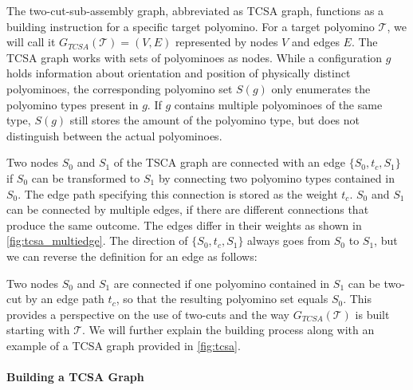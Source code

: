 The two-cut-sub-assembly graph, abbreviated as TCSA graph, functions as a building instruction for a specific target polyomino.
For a target polyomino $\mathcal{T}$, we will call it $G_{\textit{TCSA}}(\mathcal{T}) = (V,E)$ represented by nodes $V$ and edges $E$.
The TCSA graph works with sets of polyominoes as nodes.
While a configuration $g$ holds information about orientation and position of physically distinct polyominoes, the corresponding polyomino set $S(g)$ only enumerates the polyomino types present in $g$.
If $g$ contains multiple polyominoes of the same type, $S(g)$ still stores the amount of the polyomino type, but does not distinguish between the actual polyominoes.

Two nodes $S_0$ and $S_1$ of the TSCA graph are connected with an edge $\{S_0,t_c,S_1\}$ if $S_0$ can be transformed to $S_1$ by connecting two polyomino types contained in $S_0$.
The edge path specifying this connection is stored as the weight $t_c$.
$S_0$ and $S_1$ can be connected by multiple edges, if there are different connections that produce the same outcome.
The edges differ in their weights as shown in \autoref{fig:tcsa_multiedge}.
The direction of $\{S_0,t_c,S_1\}$ always goes from $S_0$ to $S_1$, but we can reverse the definition for an edge as follows:

Two nodes $S_0$ and $S_1$ are connected if one polyomino contained in $S_1$ can be two-cut by an edge path $t_c$, so that the resulting polyomino set equals $S_0$.
This provides a perspective on the use of two-cuts and the way $G_{\textit{TCSA}}(\mathcal{T})$ is built starting with $\mathcal{T}$.
We will further explain the building process along with an example of a TCSA graph provided in \autoref{fig:tcsa}.


\paragraph{Building a TCSA Graph}


